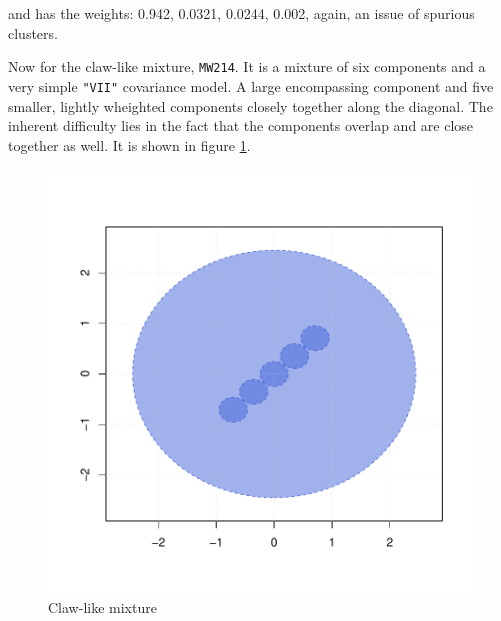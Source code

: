 and has the weights: 0.942, 0.0321, 0.0244, 0.002, again, an issue of 
spurious clusters.

Now for the claw-like mixture, {\tt MW214}. It is a mixture of six components
and a very simple {\tt "VII"} covariance model. A large encompassing component
and five smaller, lightly wheighted components closely together along the 
diagonal. The inherent difficulty lies in the fact that the components overlap
and are close together as well. It is shown in figure \ref{fig:MW214}.

\begin{figure}[h!]
    \begin{Rgraph}[0.9]
\includegraphics{chapter3-figMW214}
    \caption{Claw-like mixture}
    \label{fig:MW214}
    \end{Rgraph}
\end{figure}



